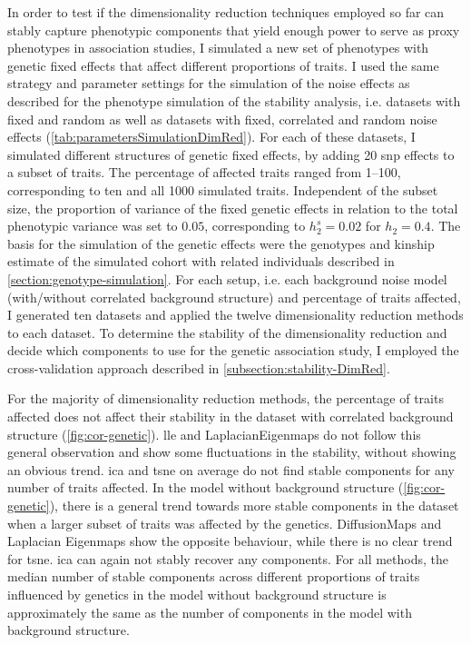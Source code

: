 In order to test if the dimensionality reduction techniques employed so far can stably capture phenotypic components that yield enough power to serve as proxy phenotypes in association studies, I simulated a new set of phenotypes with genetic fixed effects that affect different proportions of traits. I used the same strategy and parameter settings for the simulation of the noise effects as described for the phenotype simulation of the stability analysis, i.e. datasets with fixed and random as well as datasets with fixed, correlated and random noise effects (\cref{tab:parametersSimulationDimRed}). For each of these datasets, I simulated different structures of genetic fixed effects, by adding \num{20} \gls{snp} effects to a subset of traits. The percentage of affected traits ranged from \numrange{1}{100}, corresponding to ten and all \num{1000} simulated traits. Independent of the subset size, the proportion of variance of the fixed genetic effects in relation to the total phenotypic variance was set to \(0.05\), corresponding to \(h^s_2=0.02\) for \(h_2=0.4\). The basis for the simulation of the genetic effects were the genotypes and kinship estimate of the simulated cohort with related individuals described in \cref{section:genotype-simulation}.  For each setup, i.e. each background noise model (with/without correlated background structure) and percentage of traits affected, I generated ten datasets and applied the twelve dimensionality reduction methods to each dataset. To determine the stability of the dimensionality reduction and decide which components to use for the genetic association study, I employed the cross-validation approach described in \cref{subsection:stability-DimRed}. 

For the majority of dimensionality reduction methods, the percentage of traits affected does not affect their stability in the dataset with correlated background structure (\cref{fig:cor-genetic}). \gls{lle} and LaplacianEigenmaps do not follow this general observation and show some fluctuations in the stability, without showing an obvious trend.  \gls{ica} and \gls{tsne} on average do not find stable components for any number of traits affected. In the model without background structure (\cref{fig:cor-genetic}), there is a general trend towards more stable components in the dataset when a larger subset of traits was affected by the genetics. DiffusionMaps and Laplacian Eigenmaps show the opposite behaviour, while there is no clear trend for \gls{tsne}. \gls{ica} can again not stably recover any components. For all methods, the median number of stable components across different proportions of traits influenced by genetics in the model without background structure is approximately the same as the number of components in the model with background structure. 

